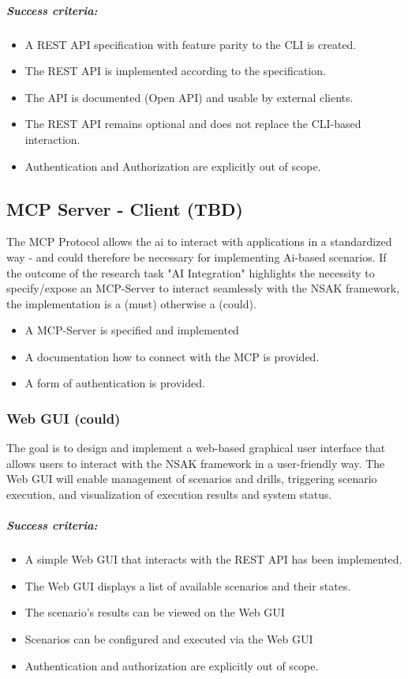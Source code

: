 \subparagraph{Success criteria:}

\begin{itemize}
	\item A REST API specification with feature parity to the CLI is created.
	\item The REST API is implemented according to the specification.
	\item The API is documented (Open API) and usable by external clients.
	\item The REST API remains optional and does not replace the CLI-based interaction.
	\item Authentication and Authorization are explicitly out of scope.
\end{itemize}

\subsection{MCP Server - Client (TBD)}

The MCP Protocol allows the ai to interact with applications in a standardized way - and could therefore be necessary for implementing Ai-based scenarios. 
If the outcome of the research task "AI Integration" highlights the necessity to specify/expose an MCP-Server to interact seamlessly with the NSAK framework, the implementation is a (must) otherwise a (could). 

\begin{itemize}
	\item A MCP-Server is specified and implemented
	\item A documentation how to connect with the MCP is provided.
	\item A form of authentication is provided.
\end{itemize}


\subsubsection{Web GUI (could)}

The goal is to design and implement a web-based graphical user interface that allows users to interact with the NSAK framework in a user-friendly way. The Web GUI will enable management of scenarios and drills, triggering scenario execution, and visualization of execution results and system status.

\subparagraph{Success criteria:}

\begin{itemize}
	\item A simple Web GUI that interacts with the REST API has been implemented.
	\item The Web GUI displays a list of available scenarios and their states.
	\item The scenario's results can be viewed on the Web GUI
	\item Scenarios can be configured and executed via the Web GUI
	\item Authentication and authorization are explicitly out of scope.
\end{itemize}
\newpage

